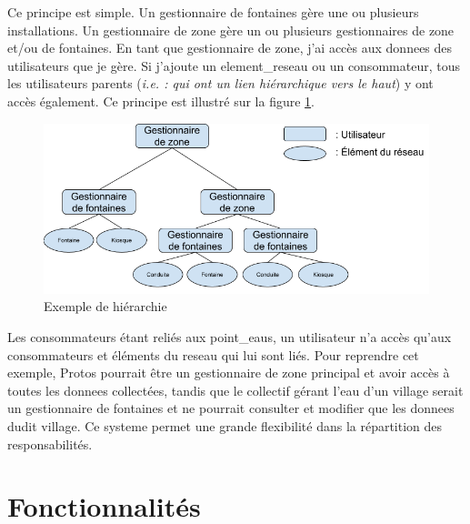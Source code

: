 \documentclass[a4paper, 11pt]{article}
\begin{document}
    Ce principe est simple. Un gestionnaire de \glspl{fontaine} gère une ou plusieurs installations. Un gestionnaire de \gls{zone} gère un ou plusieurs gestionnaires de \gls{zone} et/ou de \glspl{fontaine}. En tant que gestionnaire de \gls{zone}, j'ai accès aux \glspl{donnee} des \glspl{utilisateur} que je gère. Si j'ajoute un \gls{element_reseau} ou un \gls{consommateur}, tous les \glspl{utilisateur} parents (\emph{i.e. : qui ont un lien hiérarchique vers le haut}) y ont accès également. Ce principe est illustré sur la figure \ref{fig:hierarchie}.

    \begin{figure}[H]
      \centering
      \includegraphics[width=.8\textwidth]{Cahier_des_Charges/principe_hierarchique}
      \caption{Exemple de hiérarchie}
      \label{fig:hierarchie}
    \end{figure}

    Les \glspl{consommateur} étant reliés aux \glspl{point_eau}, un \gls{utilisateur} n'a accès qu'aux \glspl{consommateur} et éléments du \gls{reseau} qui lui sont liés. Pour reprendre cet exemple, Protos pourrait être un gestionnaire de \gls{zone} principal et avoir accès à toutes les \glspl{donnee} collectées, tandis que le collectif gérant l'eau d'un village serait un gestionnaire de \glspl{fontaine} et ne pourrait consulter et modifier que les \glspl{donnee} dudit village. Ce \gls{systeme} permet une grande flexibilité dans la répartition des responsabilités.
\section{Fonctionnalités}
\end{document}
